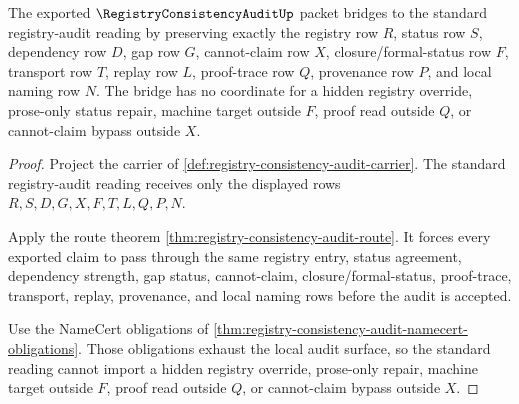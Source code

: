 
\begin{theorem}
\label{thm:registry-consistency-audit-standard-bridge}
The exported $\RegistryConsistencyAuditUp$ packet bridges to the standard registry-audit reading by preserving exactly the registry row $R$, status row $S$, dependency row $D$, gap row $G$, cannot-claim row $X$, closure/formal-status row $F$, transport row $T$, replay row $L$, proof-trace row $Q$, provenance row $P$, and local naming row $N$. The bridge has no coordinate for a hidden registry override, prose-only status repair, machine target outside $F$, proof read outside $Q$, or cannot-claim bypass outside $X$.
\end{theorem}
\begin{proof}
Project the carrier of \autoref{def:registry-consistency-audit-carrier}. The standard registry-audit reading receives only the displayed rows $R,S,D,G,X,F,T,L,Q,P,N$.

Apply the route theorem \autoref{thm:registry-consistency-audit-route}. It forces every exported claim to pass through the same registry entry, status agreement, dependency strength, gap status, cannot-claim, closure/formal-status, proof-trace, transport, replay, provenance, and local naming rows before the audit is accepted.

Use the NameCert obligations of \autoref{thm:registry-consistency-audit-namecert-obligations}. Those obligations exhaust the local audit surface, so the standard reading cannot import a hidden registry override, prose-only repair, machine target outside $F$, proof read outside $Q$, or cannot-claim bypass outside $X$.
\end{proof}


